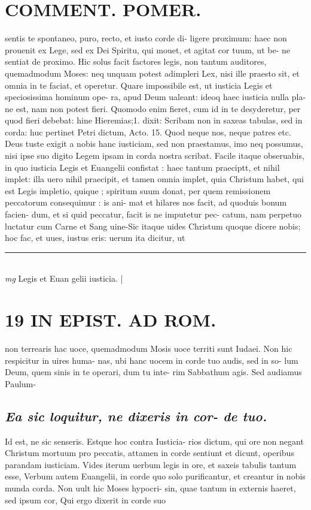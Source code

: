 \documentclass{article}
\begin{document}
\begin{pages}
\section*{COMMENT. POMER.  }\pstart sentis te spontaneo, puro, recto, et iusto corde di- ligere proximum: haec non prouenit ex Lege, sed ex Dei Spiritu, qui mouet, et agitat cor tuum, ut be- ne sentiat de proximo. Hic solus facit factores legis, non tantum auditores, quemadmodum Moses: neq unquam potest adimpleri Lex, nisi ille praesto sit, et omnia in te faciat, et operetur. Quare impossibile est, ut iusticia Legis et speciosissima hominum ope- ra, apud Deum ualeant: ideoq haec iusticia nulla pla- ne est, nam non potest fieri. Quomodo enim fieret, cum id in te desyderetur, per quod fieri debebat: hine Hieremias;1. dixit: Scribam non in saxeas tabulas, sed in corda: huc pertinet Petri dictum, Acto. 15.  Quod neque nos, neque patres etc. Deus tuste exigit a nobis hanc iusticiam, sed non praestamus, imo neq possumus, nisi ipse suo digito Legem ipsam in corda nostra scribat. Facile itaque obseruabis, in quo iusticia Legis et Euangelii confistat : haec tantum praeciptt, et nihil implet: illa uero nihil praecipit, et tamen omnia implet, quia Christum habet, qui est Legis impletio, quique ; spiritum suum donat, per quem remissionem peccatorum consequimur : is ani- mat et hilares nos facit, ad quoduis bonum facien- dum, et si quid peccatur, facit is ne imputetur pec- catum, nam perpetuo luctatur cum Carne et Sang uine-Sic itaque uides Christum quoque dicere nobis; hoc fac, et uues, iustus eris: uerum ita dicitur, ut  \pend
\vspace{0.5cm}\noindent
\vspace{0.2cm}\rule{1cm}{0.2pt}\\ 
\hspace{0.2cm}\textit{mg}
\footnotesize Legis et Euan gelii iusticia.  
\normalsize| 
\section*{19 IN EPIST. AD ROM.  }
\marginpar{[ p.]}\pstart non terrearis hac uoce, quemadmodum Mosis uoce territi sunt Iudaei. Non hic respicitur in uires huma- nas, ubi hanc uocem in corde tuo audis, sed in so- lum Deum, quem sinis in te operari, dum tu inte- rim Sabbathum agis. Sed audiamus Paulum-  \pend
{}
{}
\subsection*{\textit{Ea sic loquitur, ne dixeris in cor- de tuo. }}\pstart Id est, ne sic senseris. Estque hoc contra Iusticia- rios dictum, qui ore non negant Christum mortuum pro peccatis, attamen in corde sentiunt et dicunt, operibus parandam iusticiam. Vides iterum uerbum legis in ore, et saxeis tabulis tantum esse, Verbum autem Euangelii, in corde quo solo purificantur, et creantur in nobis munda corda. Non uult hic Moses hypocri- sin, quae tantum in externis haeret, sed ipsum cor, Qui ergo dixerit in corde suo  \pend
{}
{}

\end{pages}
\end{document}
